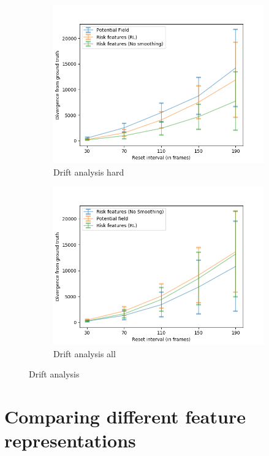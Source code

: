 \begin{figure}[htbp]
\begin{subfigure}{0.5\textwidth}
		\includegraphics[width=\linewidth]{plots/inter_method/drift_analysis_hard.png}
		\caption {Drift analysis hard}
		\label{fig:inter_method-drift_analysis_hard}
	\end{subfigure}
	\begin{subfigure}{0.5\textwidth}
		\centering
		\includegraphics[width=\linewidth]{plots/inter_method/drift_analysis_all.png}
		\caption {Drift analysis all}
		\label{fig:inter_method-drift_analysis_all}
	\end{subfigure}
	\caption{Drift analysis}
\end{figure}


\section{Comparing different feature representations}
\label{sec:comparing-other-featreps}
